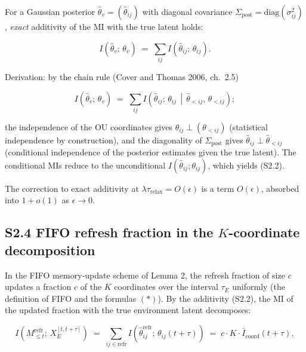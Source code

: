 \documentclass[pdflatex,sn-mathphys-ay]{sn-jnl}
\providecommand{\lt}{<}\providecommand{\gt}{>}
\begin{document}
For a Gaussian posterior \(\hat\theta_v = (\hat\theta_{ij})\) with diagonal covariance \(\Sigma_{\text{post}} = \text{diag}(\sigma_{ij}^2)\), \emph{exact} additivity of the MI with the true latent holds:



\begin{equation}I(\hat\theta_v;\, \theta_v) \;=\; \sum_{ij} I(\hat\theta_{ij};\, \theta_{ij}). \tag{S2.2}\end{equation}



Derivation: by the chain rule (Cover and Thomas 2006, ch.~2.5)



\[I(\hat\theta_v;\, \theta_v) \;=\; \sum_{ij} I\!\left(\hat\theta_{ij};\, \theta_{ij} \,\middle|\, \hat\theta_{\lt ij},\, \theta_{\lt ij}\right);\]



the independence of the OU coordinates gives \(\theta_{ij} \perp (\theta_{\lt ij})\) (statistical independence by construction), and the diagonality of \(\Sigma_{\text{post}}\) gives \(\hat\theta_{ij} \perp \hat\theta_{\lt ij}\) (conditional independence of the posterior estimates given the true latent). The conditional MIs reduce to the unconditional \(I(\hat\theta_{ij}; \theta_{ij})\), which yields (S2.2).



The correction to exact additivity at \(\lambda \tau_{\text{relax}} = O(\epsilon)\) is a term \(O(\epsilon)\), absorbed into \(1 + o(1)\) as \(\epsilon \to 0\).



\subsection*{\texorpdfstring{S2.4 FIFO refresh fraction in the \(K\)-coordinate decomposition}{S2.4 FIFO refresh fraction in the K-coordinate decomposition}}\label{s2.4-fifo-refresh-fraction-in-the-k-coordinate-decomposition}



In the FIFO memory-update scheme of Lemma 2, the refresh fraction of size \(c\) updates a fraction \(c\) of the \(K\) coordinates over the interval \(\tau_E\) uniformly (the definition of FIFO and the formulas \((*)\)). By the additivity (S2.2), the MI of the updated fraction with the true environment latent decomposes:



\begin{equation}I(M_{\le t}^{\text{refr}};\, X_E^{[t, t+\tau]}) \;=\; \sum_{ij \in \text{refr}} I(\hat\theta_{ij}^{\text{refr}};\, \theta_{ij}(t+\tau)) \;=\; c \cdot K \cdot \bar I_{\text{coord}}(t+\tau), \tag{S2.3}\end{equation}
\end{document}
